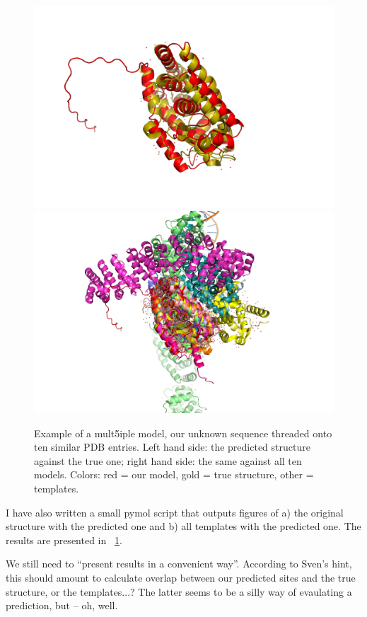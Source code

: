 \documentclass[12pt,a4paper,notitlepage,onecolumn]{article}
\begin{document}
\begin{figure}[h!]
 \begin{center}
  \includegraphics[width=0.45\linewidth]{prediction_truth.png}
  \includegraphics[width=0.45\linewidth]{prediction_templates.png}
  \caption{Example of a mult5iple model, our unknown sequence threaded onto ten similar PDB entries. Left hand side: the predicted structure against the true one; right hand side: the same against all ten models. Colors: red = our model, gold = true structure, other = templates.}
  \label{fig:tt}
 \end{center}
\end{figure}
 I have also written a small pymol script that outputs figures of a) the original structure with the predicted one and b) all templates with the predicted one. The results are presented in \figurename~\ref{fig:tt}.

We still need to ``present results in a convenient way''. According to Sven's hint, this should amount to calculate overlap between our predicted sites and the true structure, or the templates...? The latter seems to be a silly way of evaulating a prediction, but -- oh, well.
\end{document}
